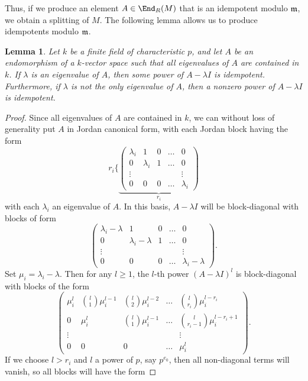 \documentclass[12pt]{article}
\theoremstyle{theorem}
\numberwithin{thm}{section}
\newtheorem{lem}[thm]{Lemma}
\theoremstyle{definition}
\begin{document}
Thus, if we produce an element $A\in \End_R(M)$ that is an idempotent modulo $\mathfrak m$, we obtain a splitting of $M$.
The following lemma allows us to produce idempotents modulo $\mathfrak m$.

\begin{lem}\label{lem:jordan}
  Let $k$ be a finite field of characteristic $p$, and let $A$ be an endomorphism of a $k$-vector space such that all eigenvalues of $A$ are contained in $k$. If $\lambda$ is an eigenvalue of $A$, then some power of $A-\lambda I$ is idempotent.
  Furthermore, if $\lambda$ is not the only eigenvalue of $A$, then a  nonzero power of $A-\lambda I$ is idempotent.
\end{lem}
\begin{proof}
  Since all eigenvalues of $A$ are contained in $k$, we can without loss of generality put $A$ in Jordan canonical form, with each Jordan block having the form
  \[ r_i\Biggl\{
  \underbrace{\begin{pmatrix}
      \lambda_i & 1 & 0 & \dots & 0 \\
      0 & \lambda_i & 1  & \dots & 0 \\
      \vdots & & & & \vdots \\
      0 & 0 & 0 & \dots & \lambda_i
  \end{pmatrix}}_{r_i} \]
  with each $\lambda_i$ an eigenvalue of $A$.
  In this basis, $A-\lambda I$ will be block-diagonal with blocks of form
  \[ \begin{pmatrix}
    \lambda_i-\lambda & 1 & 0 & \dots & 0 \\
    0 & \lambda_i-\lambda & 1 & \dots & 0 \\
    \vdots & & & & \vdots \\
    0 & 0 & 0 & \dots & \lambda_i-\lambda
  \end{pmatrix}. \]
  Set $\mu_i=\lambda_i-\lambda$. Then for any $l\geq 1$, the $l$-th power $(A-\lambda I)^l$ is block-diagonal with blocks of the form
  \[ \begin{pmatrix}
    \mu_i^l & \binom{l}1\mu_i^{l-1} & \binom{l}2\mu_i^{l-2} & \dots & \binom{l}{r_i}\mu_i^{l-r_i} \\
    0 & \mu_i^l & \binom{l}1\mu_i^{l-1} & \dots & \binom{l}{r_i-1}\mu_i^{l-r_i+1} \\
    \vdots & & & & \vdots \\
    0 & 0 & 0 & \dots & \mu_i^l
  \end{pmatrix}. \]
  If we choose $l > r_i$ and $l$ a power of $p$, say $p^{e_0}$, then all non-diagonal terms will vanish, so all blocks will have the form

\end{proof}
\end{document}
